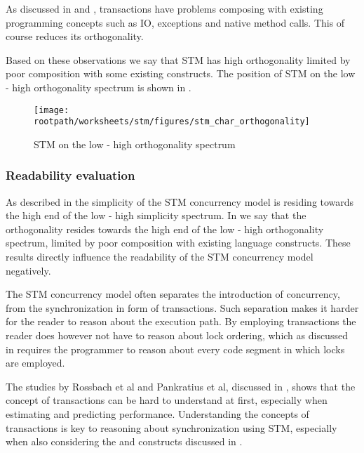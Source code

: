 As discussed in  and , transactions have problems composing with existing programming concepts such as \ac{IO}, exceptions and native method calls. This of course reduces its orthogonality.


Based on these observations we say that \ac{STM} has high orthogonality limited by poor composition with some existing constructs. The position of \ac{STM} on the low - high orthogonality spectrum is shown in .

\begin{figure}[htbp]
\centering
 \texttt{[image: \\rootpath/worksheets/stm/figures/stm\_char\_orthogonality]} 
 \caption{\ac{STM} on the low - high orthogonality spectrum}
\label{fig:char_stm_orthogonality}
\end{figure}

\subsubsection{Readability evaluation}
As described in  the simplicity of the \ac{STM} concurrency model is residing towards the high end of the low - high simplicity spectrum. In  we say that the orthogonality resides towards the high end of the low - high orthogonality spectrum, limited by poor composition with existing language constructs. These results directly influence the readability of the \ac{STM} concurrency model negatively.

The \ac{STM} concurrency model often separates the introduction of concurrency, from the synchronization in form of transactions. Such separation makes it harder for the reader to reason about the execution path. By employing transactions the reader does however not have to reason about lock ordering, which as discussed in  requires the programmer to reason about every code segment in which locks are employed.

The studies by Rossbach et al and Pankratius et al, discussed in , shows that the concept of transactions can be hard to understand at first, especially when estimating and predicting performance. Understanding the concepts of transactions is key to reasoning about synchronization using \ac{STM}, especially when also considering the  and  constructs discussed in .

